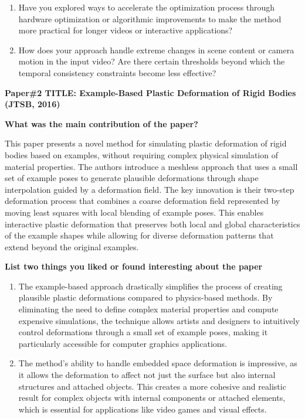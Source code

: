 \documentclass[
]{article}
\begin{document}
\begin{enumerate}
\def\labelenumi{\arabic{enumi}.}
\item
  Have you explored ways to accelerate the optimization process through hardware optimization or algorithmic improvements to make the method more practical for longer videos or interactive applications?
\item
  How does your approach handle extreme changes in scene content or camera motion in the input video? Are there certain thresholds beyond which the temporal consistency constraints become less effective?
\end{enumerate}

\newpage
\textbf{Paper\#2 TITLE: Example-Based Plastic Deformation of Rigid Bodies (JTSB, 2016)}

\textbf{What was the main contribution of the paper?}

This paper presents a novel method for simulating plastic deformation of rigid bodies based on examples, without requiring complex physical simulation of material properties. The authors introduce a meshless approach that uses a small set of example poses to generate plausible deformations through shape interpolation guided by a deformation field. The key innovation is their two-step deformation process that combines a coarse deformation field represented by moving least squares with local blending of example poses. This enables interactive plastic deformation that preserves both local and global characteristics of the example shapes while allowing for diverse deformation patterns that extend beyond the original examples.

\textbf{List two things you liked or found interesting about the paper}

\begin{enumerate}
\def\labelenumi{\arabic{enumi}.}
\item
  The example-based approach drastically simplifies the process of creating plausible plastic deformations compared to physics-based methods. By eliminating the need to define complex material properties and compute expensive simulations, the technique allows artists and designers to intuitively control deformations through a small set of example poses, making it particularly accessible for computer graphics applications.
\item
  The method's ability to handle embedded space deformation is impressive, as it allows the deformation to affect not just the surface but also internal structures and attached objects. This creates a more cohesive and realistic result for complex objects with internal components or attached elements, which is essential for applications like video games and visual effects.
\end{enumerate}
\end{document}
